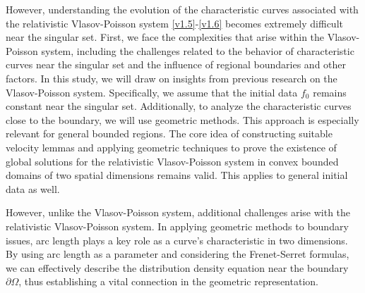 \documentclass[11pt,reqno]{amsart}%
\theoremstyle{definition}
\theoremstyle{remark}
\begin{document}
However, understanding the evolution of the characteristic curves associated with the relativistic Vlasov-Poisson system \eqref{v1.5}-\eqref{v1.6} becomes extremely difficult near the singular set.
%
%
First, we face the complexities that arise within the Vlasov-Poisson system, including the challenges related to the behavior of characteristic curves near the singular set and the influence of regional boundaries and other factors. In this study, we will draw on insights from previous research on the Vlasov-Poisson system. Specifically, we assume that the initial data $f_{0}$ remains constant near the singular set. Additionally, to analyze the characteristic curves close to the boundary, we will use geometric methods. This approach is especially relevant for general bounded regions. The core idea of constructing suitable velocity lemmas and applying geometric techniques to prove the existence of global solutions for the relativistic Vlasov-Poisson system in convex bounded domains of two spatial dimensions remains valid. This applies to general initial data as well.

However, unlike the Vlasov-Poisson system, additional challenges arise with the relativistic Vlasov-Poisson system.  
In applying geometric methods to boundary issues, arc length plays a key role as a curve's characteristic in two dimensions. By using arc length as a parameter and considering the Frenet-Serret formulas, we can effectively describe the distribution density equation near the boundary $\partial\Omega$, thus establishing a vital connection in the geometric representation.
\end{document}
